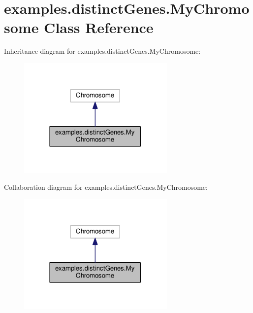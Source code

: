 \hypertarget{classexamples_1_1distinct_genes_1_1_my_chromosome}{\section{examples.\-distinct\-Genes.\-My\-Chromosome Class Reference}
\label{classexamples_1_1distinct_genes_1_1_my_chromosome}
}


Inheritance diagram for examples.\-distinct\-Genes.\-My\-Chromosome\-:
\nopagebreak
\begin{figure}[H]
\begin{center}
\leavevmode
\includegraphics[width=218pt]{classexamples_1_1distinct_genes_1_1_my_chromosome__inherit__graph}
\end{center}
\end{figure}


Collaboration diagram for examples.\-distinct\-Genes.\-My\-Chromosome\-:
\nopagebreak
\begin{figure}[H]
\begin{center}
\leavevmode
\includegraphics[width=218pt]{classexamples_1_1distinct_genes_1_1_my_chromosome__coll__graph}
\end{center}
\end{figure}
